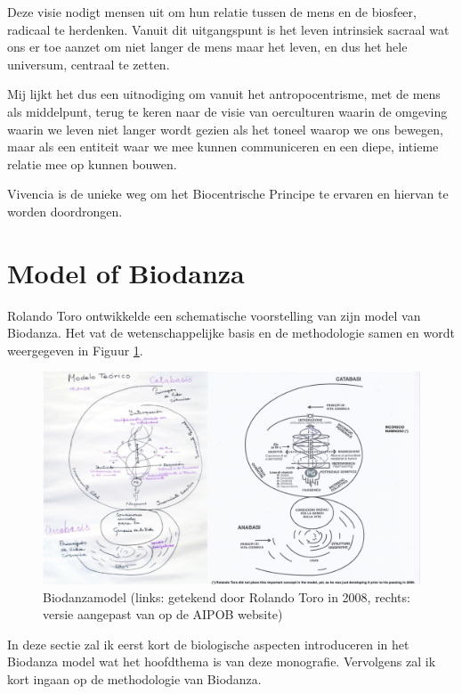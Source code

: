 \documentclass[
  11pt,
]{book}
\begin{document}
Deze visie nodigt mensen uit om hun relatie tussen de mens en de biosfeer, radicaal te herdenken. Vanuit dit uitgangspunt is het leven intrinsiek sacraal wat ons er toe aanzet om niet langer de mens maar het leven, en dus het hele universum, centraal te zetten.

Mij lijkt het dus een uitnodiging om vanuit het antropocentrisme, met de mens als middelpunt, terug te keren naar de visie van oerculturen waarin de omgeving waarin we leven niet langer wordt gezien als het toneel waarop we ons bewegen, maar als een entiteit waar we mee kunnen communiceren en een diepe, intieme relatie mee op kunnen bouwen.

Vivencia is de unieke weg om het Biocentrische Principe te ervaren en hiervan te worden doordrongen.

\hypertarget{sectionModelOfBiodanza}{%
\section{Model of Biodanza}\label{sectionModelOfBiodanza}}

Rolando Toro ontwikkelde een schematische voorstelling van zijn model van Biodanza. Het vat de wetenschappelijke basis en de methodologie samen en wordt weergegeven in Figuur \ref{fig:model}.

\begin{figure}

{\centering \includegraphics[width=1\linewidth]{./figs/biodanzamodel2andRolando} 

}

\caption{Biodanzamodel (links: getekend door Rolando Toro in 2008, rechts: versie aangepast van op de AIPOB website)}\label{fig:model}
\end{figure}

In deze sectie zal ik eerst kort de biologische aspecten introduceren in het Biodanza model wat het hoofdthema is van deze monografie. Vervolgens zal ik kort ingaan op de methodologie van Biodanza.
\end{document}
